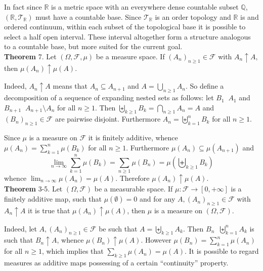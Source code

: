 \documentclass[a4paper]{article}
\newcommand{\clo}[1]{\left [ #1 \right ]}
\newcommand{\brac}[1]{\left ( #1 \right )}
\newcommand{\Real}{\mathbb{R}}
\newcommand{\Zinf}{\clo{ 0, +\infty }}
\newcommand{\Tcal}{\mathcal{T}}
\newcommand{\Fcal}{\mathcal{F}}
\newcommand{\defn}{\mathop{\overset{\Delta}{=}}\nolimits}
\begin{document}
In fact since $\Real$ is a metric space with an everywhere dense countable subset $\mathbb{Q}$, $\brac{\Real, \Tcal_\Real}$ must have a countable base. Since $\Tcal_\Real$ is an order topology and $\Real$ is and ordered continuum, within each subset of the topological base it is possible to select a half open interval. These interval altogether form a structure analogous to a countable base, but more suited for the current goal.\\

\label{thm:meas_cont_up} \noindent \textbf{Theorem} 7.
Let $\brac{\Omega, \Fcal, \mu}$ be a measure space. If $\brac{A_n}_{n\geq1}\in \Fcal$ with $A_n\uparrow A$, then $\mu\brac{A_n}\uparrow \mu\brac{A}$.

Indeed, $A_n\uparrow A$ means that $A_n\subseteq A_{n+1}$ and $A=\bigcup_{n\geq1} A_n$. So define a decomposition of a sequence of expanding nested sets as follows: let $B_1\defn A_1$ and $B_{n+1}\defn A_{n+1}\setminus A_n$ for all $n\geq1$. Then $\biguplus_{k\geq1} B_k=\bigcap_{n\geq1} A_n = A$ and $\brac{B_n}_{n\geq1}\in \Fcal$ are pairwise disjoint. Furthermore $A_n=\biguplus_{k=1}^n B_k$ for all $n\geq1$.

Since $\mu$ is a measure on $\Fcal$ it is finitely additive, whence $\mu\brac{A_n}=\sum_{k=1}^n \mu\brac{B_k}$ for all $n\geq1$. Furthermore $\mu\brac{A_n}\subseteq \mu\brac{A_{n+1}}$ and \[\lim_{n\to\infty}\sum_{k=1}^n\mu\brac{B_k}=\sum_{n\geq1}\mu\brac{B_n}=\mu\brac{\biguplus_{k\geq1}B_k}\]whence $\lim_{n\to\infty} \mu\brac{A_n}=\mu\brac{A}$. Therefore $\mu\brac{A_n}\uparrow\mu\brac{A}$.\\

\label{thm:cont_up_is_meas} \noindent \textbf{Theorem} 3-5.
Let $\brac{\Omega, \Fcal}$ be a measurable space. If $\mu:\Fcal\to\Zinf$ is a finitely additive map, such that $\mu\brac{\emptyset}=0$ and for any $A,\brac{A_n}_{n\geq1}\in \Fcal$ with $A_n\uparrow A$ it is true that $\mu\brac{A_n}\uparrow \mu\brac{A}$, then $\mu$ is a measure on $\brac{\Omega, \Fcal}$.

Indeed, let $A,\brac{A_n}_{n\geq1}\in \Fcal$ be such that $A=\biguplus_{k\geq1} A_k$. Then $B_n\defn \biguplus_{k=1}^n A_k$ is such that $B_n\uparrow A$, whence $\mu\brac{B_n}\uparrow\mu\brac{A}$. However $\mu\brac{B_n}=\sum_{k=1}^n \mu\brac{A_n}$ for all $n\geq1$, which implies that $\sum_{k\geq1}\mu\brac{A_n}=\mu\brac{A}$. It is possible to regard measures as additive maps possessing of a certain ``continuity'' property.\\
\end{document}
